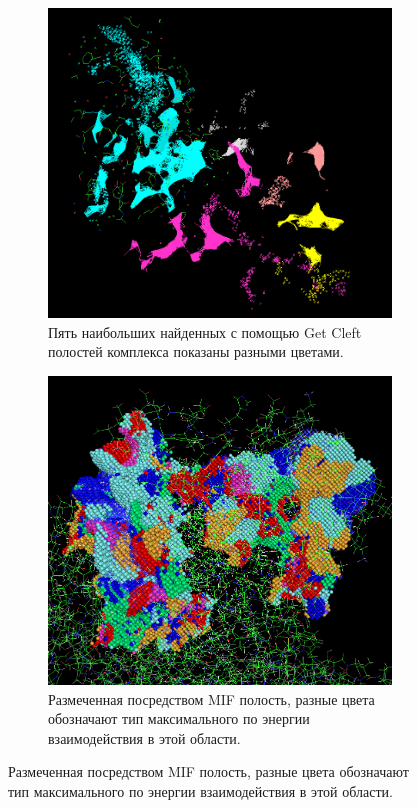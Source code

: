 \documentclass[a4paper,14pt]{article}         %
\begin{document}
\begin{figure} 
	\caption{Визуализация работы (а) поиска полостей и (б) вычисления MIF.}
	\label{cleft_mif} 
	\begin{subfigure}{.45\textwidth}
		\centering
		\includegraphics[width=1\linewidth]{pictures/clefts}
		\caption{Пять наибольших найденных с помощью Get Cleft полостей комплекса показаны разными цветами.}
		\label{fig:sfig1}
	\end{subfigure}
	\hfill
	\begin{subfigure}{.45\textwidth}
		\centering
		\includegraphics[width=1\linewidth]{pictures/mif}
		\caption{Размеченная посредством MIF полость, разные цвета обозначают тип максимального по энергии взаимодействия в этой области.}
		\label{fig:sfig2}
	\end{subfigure}
\end{figure}
\newpage
\end{document}
